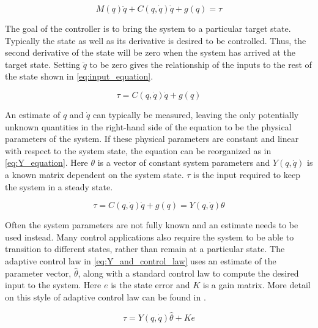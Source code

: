 \documentclass[letterpaper, 10 pt, conference]{ieeeconf}  %
\begin{document}
\begin{equation} \label{eq:physical_equation}
M(q)\ddot{q} + C(q,\dot{q})\dot{q} + g(q) = \tau
\end{equation}

The goal of the controller is to bring the system to a particular target state.
Typically the state as well as its derivative is desired to be controlled.
Thus, the second derivative of the state will be zero when the system has arrived at the target state.
Setting $\ddot{q}$ to be zero gives the relationship of the inputs to the rest of the state shown in \eqref{eq:input_equation}.

\begin{equation} \label{eq:input_equation}
\tau = C(q,\dot{q})\dot{q} + g(q)
\end{equation}

An estimate of $q$ and $\dot{q}$ can typically be measured, leaving the only potentially unknown quantities in the right-hand side of the equation to be the physical parameters of the system.
If these physical parameters are constant and linear with respect to the system state, the equation can be reorganized as in \eqref{eq:Y_equation}.
Here $\theta$ is a vector of constant system parameters and $Y(q,\dot{q})$ is a known matrix dependent on the system state. 
$\tau$ is the input required to keep the system in a steady state.

\begin{equation} \label{eq:Y_equation}
\tau = C(q,\dot{q})\dot{q} + g(q) = Y(q,\dot{q})\theta
\end{equation}

Often the system parameters are not fully known and an estimate needs to be used instead.
Many control applications also require the system to be able to transition to different states, rather than remain at a particular state.
The adaptive control law in \eqref{eq:Y_and_control_law} uses an estimate of the parameter vector, $\hat{\theta}$, along with a standard control law to compute the desired input to the system. Here $e$ is the state error and $K$ is a gain matrix.
More detail on this style of adaptive control law can be found in \cite{slotine1987adaptive, slotine1991applied, cheah2006adaptive}.

\begin{equation} \label{eq:Y_and_control_law}
\tau = Y(q,\dot{q})\hat{\theta} + Ke
\end{equation}
\end{document}
